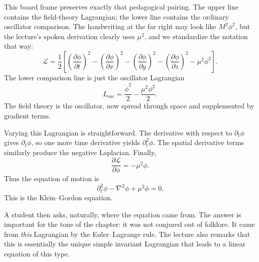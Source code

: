 This board frame preserves exactly that pedagogical pairing. The upper line contains the field-theory Lagrangian; the lower line contains the ordinary oscillator comparison. The handwriting at the far right may look like \(M^2\phi^2\), but the lecture's spoken derivation clearly uses \(\mu^2\), and we standardize the notation that way:
\begin{equation}
\mathcal L
=
\frac12
\left[
\left(\frac{\partial\phi}{\partial t}\right)^2
-\left(\frac{\partial\phi}{\partial x}\right)^2
-\left(\frac{\partial\phi}{\partial y}\right)^2
-\left(\frac{\partial\phi}{\partial z}\right)^2
-\mu^2\phi^2
\right].
\end{equation}
The lower comparison line is just the oscillator Lagrangian
\begin{equation}
L_{\mathrm{osc}}=\frac{\dot\phi^2}{2}-\frac{\mu^2\phi^2}{2}.
\end{equation}
The field theory is the oscillator, now spread through space and supplemented by gradient terms.

Varying this Lagrangian is straightforward. The derivative with respect to \(\partial_t\phi\) gives \(\partial_t\phi\), so one more time derivative yields \(\partial_t^2\phi\). The spatial derivative terms similarly produce the negative Laplacian. Finally,
\begin{equation}
\frac{\partial\mathcal L}{\partial\phi}=-\mu^2\phi.
\end{equation}
Thus the equation of motion is
\begin{equation}
\partial_t^2\phi-\nabla^2\phi+\mu^2\phi=0.
\end{equation}
This is the Klein--Gordon equation.

A student then asks, naturally, where the equation came from. The answer is important for the tone of the chapter: it was not conjured out of folklore. It came from \emph{this} Lagrangian by the Euler--Lagrange rule. The lecture also remarks that this is essentially the unique simple invariant Lagrangian that leads to a linear equation of this type.


